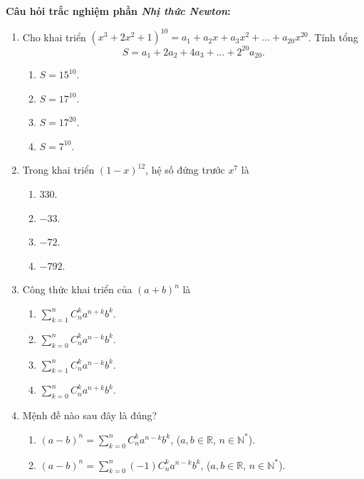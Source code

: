 \noindent\textbf{Câu hỏi trắc nghiệm phần \textit{Nhị thức Newton}:}\par
\begin{enumerate}[label=\textbf{Câu \arabic*.},align=left,left=0cm..0cm,itemindent=*]
	\item Cho khai triển $\left(x^3+2x^2+1\right)^{10}=a_1+a_2x+a_3x^2+...+a_{20}x^{20}$. Tính tổng $$S=a_1+2a_2+4a_3+...+2^{20}a_{20}.$$
	\begin{multicols}{4}\begin{enumerate}[label=\textbf{\Alph*.},align=left,left=1cm..0cm,itemindent=*]
		\item $S=15^{10}$. \item $S=17^{10}$. \item $S=17^{20}$. \item $S=7^{10}$.
	\end{enumerate}\end{multicols}
	\item Trong khai triển $(1-x)^{12}$, hệ số đứng trước $x^7$ là
	\begin{multicols}{4}\begin{enumerate}[label=\textbf{\Alph*.},align=left,left=1cm..0cm,itemindent=*]
		\item $330$. \item $-33$. \item $-72$. \item $-792$.
	\end{enumerate}\end{multicols}
	\item Công thức khai triển của $(a+b)^n$ là
	\begin{enumerate}[label=\textbf{\Alph*.},align=left,left=1cm..0cm,itemindent=*]
		\item $\sum_{k=1}^nC_n^ka^{n+k}b^k$. \item $\sum_{k=0}^nC_n^ka^{n-k}b^k$. \item $\sum_{k=1}^nC_n^ka^{n-k}b^k$. \item $\sum_{k=0}^nC_n^ka^{n+k}b^k$.
	\end{enumerate}
	\item Mệnh đề nào sau đây là đúng?
	\begin{enumerate}[label=\textbf{\Alph*.},align=left,left=1cm..0cm,itemindent=*]
		\item $(a-b)^n=\sum_{k=0}^nC_n^ka^{n-k}b^k$, ($a,b\in\mathbb{R}$, $n\in\mathbb{N}^{*}$).
		\item $(a-b)^n=\sum_{k=0}^n(-1)C_n^ka^{n-k}b^k$, ($a,b\in\mathbb{R}$, $n\in\mathbb{N}^{*}$).

\end{enumerate}
\end{enumerate}
